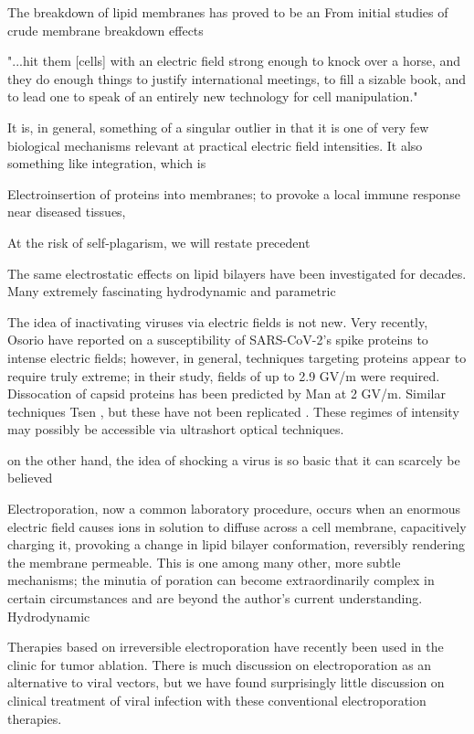 \documentclass[fleqn,10pt]{paper}
\begin{document}
The breakdown of lipid membranes has proved to be an From initial studies of crude membrane breakdown effects \cite{Reversible1979}

"...hit them [cells] with an electric field strong enough to knock over a horse, and they do enough things to justify international meetings, to fill a sizable book, and to lead one to speak of an entirely new technology for cell manipulation."

It is, in general, something of a singular outlier in that it is one of very few biological mechanisms relevant at practical electric field intensities. It also something like integration, which is

Electroinsertion of proteins into membranes\cite{Clinical1996}; to provoke a local immune response near diseased tissues, 



At the risk of self-plagarism, we will restate precedent 

The same electrostatic effects on lipid bilayers have been investigated for decades. Many extremely fascinating hydrodynamic and parametric 

The idea of inactivating viruses via electric fields is not new. Very recently, Osorio \cite{Receptor2021} have reported on a susceptibility of SARS-CoV-2's spike proteins to intense electric fields; however, in general, techniques targeting proteins appear to require truly extreme; in their study, fields of up to 2.9 GV/m were required. Dissocation of capsid proteins has been predicted by Man \cite{Picosecond2016b} at 2 GV/m. Similar techniques Tsen \cite{Studies2014}, but these have not been replicated \cite{No2011}. These regimes of intensity may possibly be accessible via ultrashort optical techniques.

on the other hand, the idea of shocking a virus is so basic that it can scarcely be believed 


Electroporation\cite{Electroporation1988}, now a common laboratory procedure, occurs when an enormous electric field causes ions in solution to diffuse across a cell membrane, capacitively charging it, provoking a change in lipid bilayer conformation\cite{Membrane2016}, reversibly rendering the membrane permeable. This is one among many other, more subtle mechanisms; the minutia of poration can become extraordinarily complex in certain circumstances and are beyond the author's current understanding\cite{Theoretical2007}. Hydrodynamic

Therapies based on irreversible electroporation\cite{Nonthermal2013}\cite{Lipid2017} have recently been used in the clinic\cite{Irreversible2013} for tumor ablation. There is much discussion on electroporation as an alternative to viral vectors, but we have found surprisingly little discussion on clinical treatment of viral infection with these conventional electroporation therapies.
\end{document}

